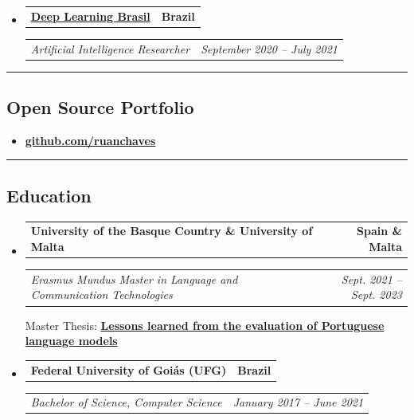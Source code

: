 \documentclass[11pt,letterpaper]{article}
\makeatletter
\newcommand{\headerrow}[2]{\begin{tabular*}{\linewidth}{l@{\extracolsep{\fill}}r}#1 &#2 \\ \end{tabular*}}
\makeatother
\begin{document}
\begin{itemize}[leftmargin=1em]
	\item
	      \headerrow
	      {\href{https://embrapii.org.br/en/unidades/embrapii-unit-in-artificial-intelligence-ceia-ufg-center-of-excellence-in-artificial-intelligence/}{\textbf{Deep Learning Brasil}}}
	      {\textbf{Brazil}}
	      \headerrow
	      {\emph{Artificial Intelligence Researcher}}
	      {\emph{September 2020 -- July 2021}}

\end{itemize}

\hrule
\subsection*{\Large Open Source Portfolio}

\begin{itemize}[leftmargin=1em, nosep] %
	\item
		{\href{https://github.com/ruanchaves}{\textbf{github.com/ruanchaves}}}
\end{itemize}

\hrule
\subsection*{\Large Education}

\begin{itemize}[leftmargin=1em]
	\parskip=0.1em
	
	\item
	      \headerrow
	      {\textbf{University of the Basque Country \& University of Malta}}
	      {\textbf{Spain \& Malta}}
	      \headerrow
	      {\emph{Erasmus Mundus Master in Language and Communication Technologies}}
	      {\emph{Sept. 2021 -- Sept. 2023}}
	    
        Master Thesis: {\href{https://www.um.edu.mt/library/oar/handle/123456789/120557}{\textbf{Lessons learned from the evaluation of Portuguese language models}}}

	\item
	      \headerrow
	      {\textbf{Federal University of Goi\'as (UFG)}}
	      {\textbf{Brazil}}
	      \headerrow
	      {\emph{Bachelor of Science, Computer Science}}
	      {\emph{January 2017 -- June 2021}}

\end{itemize}
\end{document}
